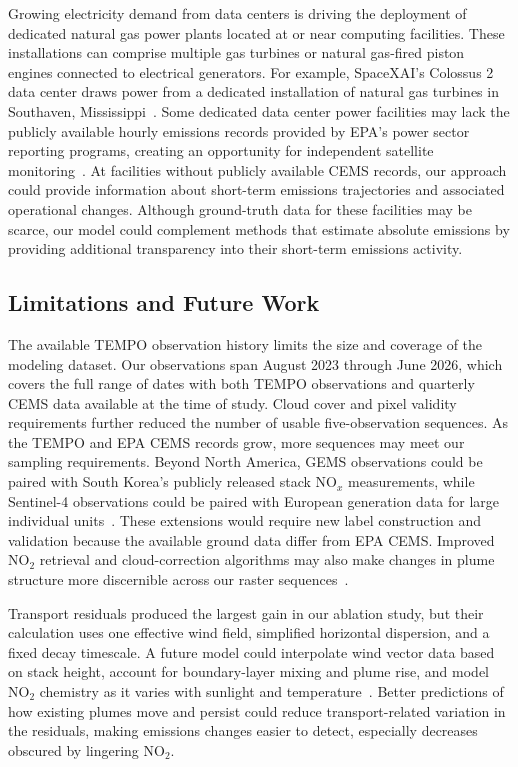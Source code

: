 \documentclass[sigconf,nonacm]{acmart}
\newcommand{\NOx}{NO$_x$}
\begin{document}
Growing electricity demand from data centers is driving the deployment of
dedicated natural gas power plants located at or near computing facilities. These
installations can comprise multiple gas turbines or natural gas-fired piston
engines connected to electrical generators. For example, SpaceXAI's Colossus 2 data
center draws power from a dedicated installation of natural gas turbines in
Southaven, Mississippi~\cite{eia2026dataCenterDemand,gauld2026dataCenter}. Some
dedicated data center power facilities may lack the publicly available hourly
emissions records provided by EPA's power sector reporting programs, creating an
opportunity for independent satellite monitoring~\cite{epa2026islandedGeneration}.
At facilities without publicly available CEMS records, our approach could provide
information about short-term emissions trajectories and associated operational
changes. Although ground-truth data for these facilities may be scarce, our model
could complement methods that estimate absolute emissions by providing additional
transparency into their short-term emissions activity.

\subsection{Limitations and Future Work}

The available TEMPO observation history limits the size and coverage of the modeling dataset.
Our observations span August 2023 through June 2026, which covers the full range of dates with both
TEMPO observations and quarterly CEMS data available at the time of study.
Cloud cover and pixel validity requirements further reduced the number of usable
five-observation sequences. As the TEMPO and EPA CEMS records grow, more sequences may meet our
sampling requirements. Beyond North America, GEMS observations could be paired with South Korea's publicly
released stack \NOx{} measurements, while Sentinel-4 observations could be paired with European generation
data for large individual units~\cite{yang2024gems,keco2026cleansys,esa2025sentinel4,entsoe2014transparency}.
These extensions would require new label construction and validation because the available ground data
differ from EPA CEMS. Improved NO$_2$ retrieval and cloud-correction algorithms may also make changes in
plume structure more discernible across our raster sequences~\cite{seo2024gemsRetrieval}.

Transport residuals produced the largest gain in our ablation study, but their calculation uses one effective
wind field, simplified horizontal dispersion, and a fixed decay timescale. A future model could interpolate
wind vector data based on stack height, account for boundary-layer mixing and plume rise, and model NO$_2$
chemistry as it varies with sunlight and temperature~\cite{huang2026detectability,meier2024conversion}.
Better predictions of how existing plumes move and persist could reduce transport-related variation in the
residuals, making emissions changes easier to detect, especially decreases obscured by lingering NO$_2$.
\end{document}
